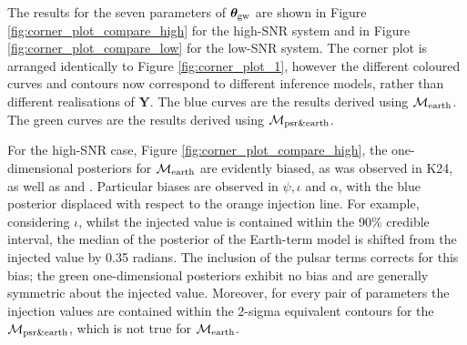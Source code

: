\documentclass[fleqn,usenatbib,useAMS]{mnras}
\begin{document}
The results for the seven parameters of  $\boldsymbol{\theta}_{\rm gw}$ are shown in Figure \ref{fig:corner_plot_compare_high} for the high-SNR system and in Figure \ref{fig:corner_plot_compare_low} for the low-SNR system. The corner plot is arranged identically to Figure \ref{fig:corner_plot_1}, however the different coloured curves and contours now correspond to different inference models, rather than different realisations of $\boldsymbol{Y}$. The blue curves are the results derived using $\mathcal{M}_{\rm earth}$. The green curves are the results derived using $\mathcal{M}_{\rm psr \& earth}$. \newline 
		
For the high-SNR case, Figure \ref{fig:corner_plot_compare_high}, the one-dimensional posteriors for $\mathcal{M}_{\rm earth}$ are evidently biased, as was observed in K24, as well as \cite{Zhupulsarterms} and \cite{Chen2022}. Particular biases are observed in $\psi, \iota $ and $\alpha$, with the blue posterior displaced with respect to the orange injection line. For example, considering $\iota$, whilst the injected value is contained within the 90\% credible interval, the median of the posterior of the Earth-term model is shifted from the injected value by 0.35 radians. The inclusion of the pulsar terms corrects for this bias; the green one-dimensional posteriors exhibit no bias and are generally symmetric about the injected value. Moreover, for every pair of parameters the injection values are contained within the 2-sigma equivalent contours for the $\mathcal{M}_{\rm psr \& earth}$, which is not true for $\mathcal{M}_{\rm earth}$. \newline 
\end{document}
